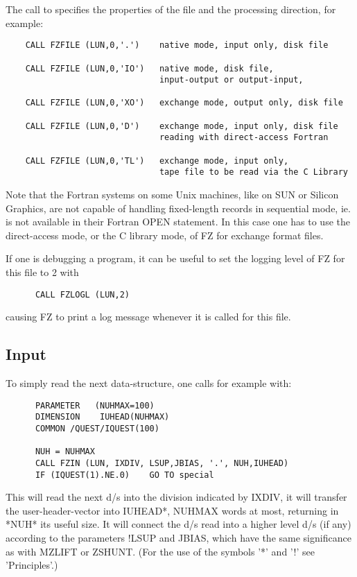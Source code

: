 The call to  specifies the properties of the file
and the processing direction, for example:
\begin{verbatim}
    CALL FZFILE (LUN,0,'.')    native mode, input only, disk file

    CALL FZFILE (LUN,0,'IO')   native mode, disk file,
                               input-output or output-input,

    CALL FZFILE (LUN,0,'XO')   exchange mode, output only, disk file

    CALL FZFILE (LUN,0,'D')    exchange mode, input only, disk file
                               reading with direct-access Fortran

    CALL FZFILE (LUN,0,'TL')   exchange mode, input only,
                               tape file to be read via the C Library

\end{verbatim}
Note that the Fortran systems on some Unix machines,
like on SUN or Silicon Graphics,
are not capable of handling fixed-length records in sequential mode,
ie.  is not available in their Fortran
OPEN statement.
In this case one has to use the direct-access mode,
or the C library mode, of FZ for exchange format files.

If one is debugging a program,
it can be useful to set the logging level of FZ for this file
to 2 with
\begin{verbatim}
      CALL FZLOGL (LUN,2)
\end{verbatim}
causing FZ to print a log message
whenever it is called for this file.

\subsection*{Input}

To simply read the next data-structure, one calls for example with:
\begin{verbatim}
      PARAMETER   (NUHMAX=100)
      DIMENSION    IUHEAD(NUHMAX)
      COMMON /QUEST/IQUEST(100)

      NUH = NUHMAX
      CALL FZIN (LUN, IXDIV, LSUP,JBIAS, '.', NUH,IUHEAD)
      IF (IQUEST(1).NE.0)    GO TO special
\end{verbatim}
This will read the next d/s into the division indicated by IXDIV,
it will transfer the user-header-vector into IUHEAD*,
NUHMAX words at most, returning in *NUH* its useful size.
It will connect the d/s read into a higher level d/s (if any)
according to the parameters !LSUP and JBIAS,
which have the same significance as with MZLIFT or ZSHUNT.
(For the use of the symbols '*' and '!' see 'Principles'.)


